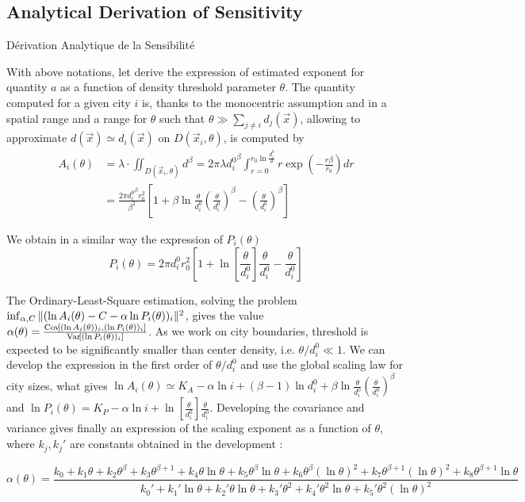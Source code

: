 \subsection{Analytical Derivation of Sensitivity}{Dérivation Analytique de la Sensibilité}

With above notations, let derive the expression of estimated exponent for quantity $a$ as a function of density threshold parameter $\theta$. The quantity computed for a given city $i$ is, thanks to the monocentric assumption and in a spatial range and a range for $\theta$ such that $\theta \gg \sum_{j\neq i}{d_j(\vec{x})}$, allowing to approximate $d(\vec{x})\simeq d_i(\vec{x})$ on $D(\vec{x}_i,\theta)$, is computed by
\[
\begin{split}
A_i(\theta) & = \lambda\cdot \iint_{D(\vec{x}_i,\theta)}{d^\beta} = 2\pi\lambda {d_i^0}^{\beta} \int_{r=0}^{r_0 \ln{\frac{d_i^0}{\theta}}}{r\exp{\left(-\frac{r\beta}{r_0}\right)}dr}\\
& = \frac{2\pi {d_i^0}^\beta r_0^2}{\beta^2} \left[1 + \beta \ln{\frac{\theta}{d_i^0}\left(\frac{\theta}{d_i^0}\right)^\beta} - \left(\frac{\theta}{d_i^0}\right)^\beta\right]
\end{split}
\]

We obtain in a similar way the expression of $P_i(\theta)$
\[
P_i(\theta) = 2\pi d_i^0 r_0^2 \left[1 + \ln{\left[\frac{\theta}{d_i^0}\right]}\frac{\theta}{d_i^0} - \frac{\theta}{d_i^0}\right]
\]

The Ordinary-Least-Square estimation, solving the problem $\inf_{\alpha,C}\| (\ln{A_i(\theta)} - C - \alpha \ln{P_i(\theta)})_i \|^2$, gives the value $\alpha(\theta) = \frac{\operatorname{Cov}\!\left[(\ln{A_i(\theta)})_i,(\ln{P_i(\theta)})_i\right]}{\operatorname{Var}\!\left[(\ln{P_i(\theta)})_i\right]}$. As we work on city boundaries, threshold is expected to be significantly smaller than center density, i.e. $\theta / d_i^0 \ll 1$. We can develop the expression in the first order of $\theta / d_i^0$ and use the global scaling law for city sizes, what gives $\ln{A_i(\theta)} \simeq K_A - \alpha \ln{i} + (\beta - 1)\ln{d_i^0} + \beta \ln{\frac{\theta}{d_i^0}\left(\frac{\theta}{d_i^0}\right)^\beta} $ and $\ln{P_i(\theta)} = K_P - \alpha \ln{i} + \ln{\left[\frac{\theta}{d_i^0}\right]}\frac{\theta}{d_i^0}$. Developing the covariance and variance gives finally an expression of the scaling exponent as a function of $\theta$, where $k_j,{k_j}'$ are constants obtained in the development :

\begin{equation}
\label{eq:th}
\alpha(\theta) = \frac{k_0 + k_1 \theta + k_2 \theta^\beta + k_3 \theta^{\beta + 1} +  k_4 \theta \ln{\theta} + k_5 \theta^\beta \ln{\theta} + k_6 \theta^\beta (\ln{\theta})^2 + k_7 \theta^{\beta + 1}(\ln{\theta})^2 + k_8 \theta^{\beta + 1}\ln{\theta}}{k_0'+k_1' \ln{\theta} + k_2' \theta \ln{\theta} + k_3' \theta^2 + k_4' \theta^2\ln{\theta} + k_5' \theta^2 (\ln{\theta})^2}
\end{equation}

